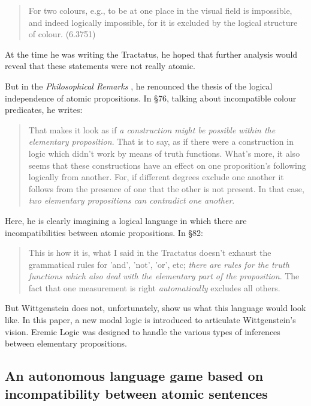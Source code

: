 \begin{quote}
  For two colours, e.g., to be at one place in the visual field is
  impossible, and indeed logically impossible, for it is excluded by
  the logical structure of colour. (6.3751)
\end{quote}

\NI At the time he was writing the Tractatus, he hoped that further
analysis would reveal that these statements were not really atomic.

But in the \emph{Philosophical Remarks} \cite{wittgenstein-remarks}, he
renounced the thesis of the logical independence of atomic
propositions.  In \S 76, talking about incompatible colour predicates,
he writes:

\begin{quote}
  That makes it look as if \emph{a construction might be possible
    within the elementary proposition}. That is to say, as if there
  were a construction in logic which didn't work by means of truth
  functions.  What's more, it also seems that these constructions have
  an effect on one proposition's following logically from another.
  For, if different degrees exclude one another it follows from the
  presence of one that the other is not present.  In that case,
  \emph{two elementary propositions can contradict one another}.
\end{quote}

\NI Here, he is clearly imagining a logical language in which there
are incompatibilities between atomic propositions. In \S 82:

\begin{quote}
  This is how it is, what I said in the Tractatus doesn't exhaust the
  grammatical rules for 'and', 'not', 'or', etc; \emph{there are rules
    for the truth functions which also deal with the elementary part
    of the proposition}.  The fact that one measurement is right
  \emph{automatically} excludes all others.
\end{quote}

\NI But Wittgenstein does not, unfortunately, show us what this
language would look like.  In this paper, a new modal logic is
introduced to articulate Wittgenstein's vision.  Eremic Logic was
designed to handle the various types of inferences between elementary
propositions.

\subsection{An autonomous language game based on incompatibility between atomic sentences}


